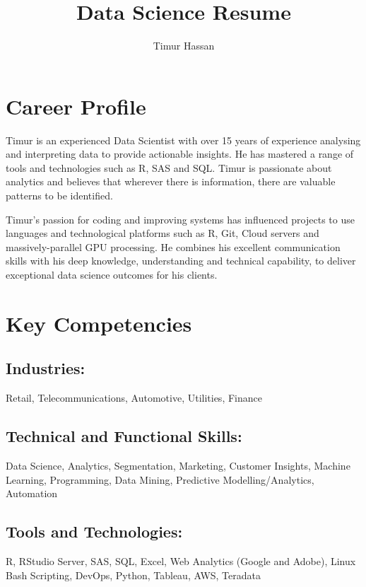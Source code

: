 \documentclass{moderncv}
\begin{document}

\author{Timur Hassan}
\title{Data Science Resume}


\maketitle

\section{Career Profile}

Timur is an experienced Data Scientist with over 15 years of experience analysing and interpreting data to provide actionable insights. He has mastered a range of tools and technologies such as R, SAS and SQL. Timur is passionate about analytics and believes that wherever there is information, there are valuable patterns to be identified.

Timur's passion for coding and improving systems has influenced projects to use languages and technological platforms such as R, Git, Cloud servers and massively-parallel GPU
processing. He combines his excellent communication skills with his deep knowledge, understanding and technical capability, to deliver exceptional data science outcomes for his clients.

\section{Key Competencies}
\subsection{Industries:}
Retail, Telecommunications, Automotive, Utilities, Finance

\subsection{Technical and Functional Skills:}
Data Science, Analytics, Segmentation, Marketing, Customer Insights, Machine Learning, Programming, Data Mining, Predictive Modelling/Analytics, Automation

\subsection{Tools and Technologies:}
R, RStudio Server, SAS, SQL, Excel, Web Analytics (Google and Adobe), Linux Bash Scripting, DevOps, Python, Tableau, AWS, Teradata
\end{document}
